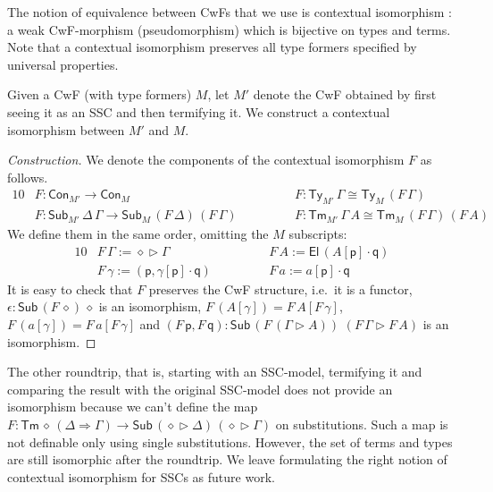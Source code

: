 \documentclass[a4paper,UKenglish,cleveref, autoref, thm-restate]{lipics-v2021}
\newcommand{\ra}{\rightarrow}
\newcommand{\Ra}{\Rightarrow}
\newcommand{\Ty}{\mathsf{Ty}}
\newcommand{\Tm}{\mathsf{Tm}}
\newcommand{\Con}{\mathsf{Con}}
\newcommand{\Sub}{\mathsf{Sub}}
\newcommand{\p}{\mathsf{p}}
\newcommand{\q}{\mathsf{q}}
\newcommand{\ext}{\mathop{\triangleright}}
\newcommand{\U}{\mathsf{U}}
\newcommand{\El}{\mathsf{El}}
\begin{document}
The notion of equivalence between CwFs that we use is contextual
isomorphism \cite{DBLP:journals/corr/abs-2211-07487}: a weak
CwF-morphism (pseudomorphism) which is bijective on types and
terms. Note that a contextual isomorphism preserves all type formers
specified by universal properties.
\begin{problem}
  Given a CwF (with type formers) $M$, let $M'$ denote the CwF
  obtained by first seeing it as an SSC and then termifying it. We
  construct a contextual isomorphism between $M'$ and $M$.
\end{problem}
\begin{proof}[Construction]
  We denote the components of the contextual isomorphism $F$ as follows.
  \begin{alignat*}{10}
    & F : \Con_{M'}\ra\Con_M && F : \Ty_{M'}\,\Gamma \cong \Ty_M\,(F\,\Gamma) \\
    & F : \Sub_{M'}\,\Delta\,\Gamma\ra\Sub_M\,(F\,\Delta)\,(F\,\Gamma)\hspace{3em} && F : \Tm_{M'}\,\Gamma\,A \cong \Tm_M\,(F\,\Gamma)\,(F\,A)
  \end{alignat*}
  We define them in the same order, omitting the $M$ subscripts:
  \begin{alignat*}{10}
    & F\,\Gamma := \diamond\ext\Gamma && F\,A := \El\,(A[\p]\cdot\q) \\
    & F\,\gamma := (\p,\gamma[\p]\cdot\q) \hspace{3em} && F\,a := a[\p]\cdot\q
  \end{alignat*}
  It is easy to check that $F$ preserves the CwF structure, i.e.\ it
  is a functor, $\epsilon : \Sub\,(F\,\diamond)\,\diamond$ is an
  isomorphism, $F\,(A[\gamma]) = F\,A[F\,\gamma]$, $F\,(a[\gamma]) =
  F\,a[F\,\gamma]$ and $(F\,\p,F\,\q) : \Sub\,(F\,(\Gamma\ext
  A))$ $(F\,\Gamma\ext F\,A)$ is an isomorphism. %
\end{proof}
The other roundtrip, that is, starting with an SSC-model, termifying
it and comparing the result with the original SSC-model does not provide an
isomorphism because we can't define the map $F :
\Tm\,\diamond\,(\Delta\Ra\Gamma) \ra
\Sub\,(\diamond\ext\Delta)\,(\diamond\ext\Gamma)$ on
substitutions. Such a map is not definable only using single
substitutions. However, the set of terms and types are still
isomorphic after the roundtrip. We leave formulating the right notion
of contextual isomorphism for SSCs as future work.
\end{document}
